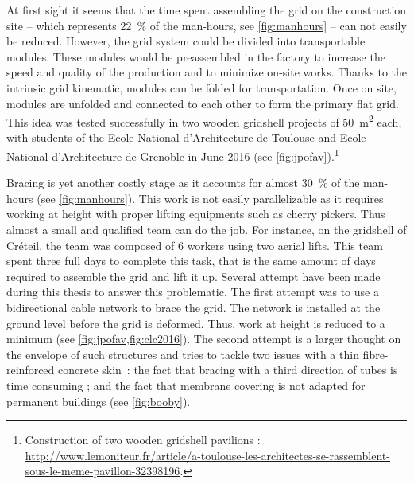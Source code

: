 At first sight it seems that the time spent assembling the grid on the construction site -- which represents 22~\% of the man-hours, see \cref{fig:manhours} -- can not easily be reduced. However, the grid system could be divided into transportable modules. These modules would be preassembled in the factory to increase the speed and quality of the production and to minimize on-site works. Thanks to the intrinsic grid kinematic, modules can be folded for transportation. Once on site, modules are unfolded and connected to each other to form the primary flat grid. This idea was tested successfully in two wooden gridshell projects of 50~m\textsuperscript{2} each, with students of the Ecole National d'Architecture de Toulouse and Ecole National d'Architecture de Grenoble in June 2016 (see \cref{fig:jpofav}).\footnote{Construction of two wooden gridshell pavilions : \url{http://www.lemoniteur.fr/article/a-toulouse-les-architectes-se-rassemblent-sous-le-meme-pavillon-32398196}.}

Bracing is yet another costly stage as it accounts for almost 30~\% of the man-hours (see \cref{fig:manhours}). This work is not easily parallelizable as it requires working at height with proper lifting equipments such as cherry pickers. Thus almost a small and qualified team can do the job. For instance, on the gridshell of Créteil, the team was composed of 6 workers using two aerial lifts. This team spent three full days to complete this task, that is the same amount of days required to assemble the grid and lift it up. Several attempt have been made during this thesis to answer this problematic. The first attempt was to use a bidirectional cable network to brace the grid. The network is installed at the ground level before the grid is deformed. Thus, work at height is reduced to a minimum (see \cref{fig:jpofav,fig:clc2016}). The second attempt is a larger thought on the envelope of such structures and tries to tackle two issues with a thin fibre-reinforced concrete skin~: the fact that bracing with a third direction of tubes is time consuming ; and the fact that membrane covering is not adapted for permanent buildings \cite{Cuvilliers2017} (see \cref{fig:booby}).

\clearpage

